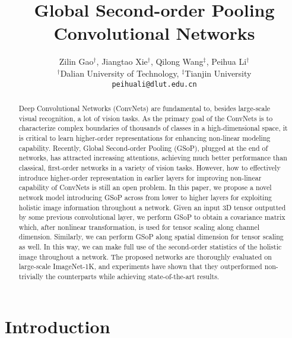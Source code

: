\documentclass[10pt,twocolumn,letterpaper]{article}
\begin{document}
\title{Global Second-order Pooling Convolutional Networks}

\author{Zilin Gao$^{\dagger}$, Jiangtao Xie$^{\dagger}$, Qilong Wang$^{\ddagger}$, Peihua Li$^{\dagger}$\\
$^{\dagger}$Dalian University of Technology, $^{\ddagger}$Tianjin University\\
{\tt\small peihuali@dlut.edu.cn}
}

\maketitle

\begin{abstract}
Deep Convolutional Networks (ConvNets) are fundamental to, besides  large-scale visual recognition, a lot of  vision tasks. As the primary goal of the ConvNets is  to characterize complex  boundaries of thousands of classes in a high-dimensional space, it is critical to learn higher-order representations for enhancing non-linear modeling capability.  Recently, Global Second-order Pooling (GSoP), plugged at the end of networks, has attracted increasing attentions, achieving much better performance than classical, first-order networks  in a variety of vision tasks. However, how to effectively introduce higher-order representation in earlier layers for improving non-linear capability of ConvNets  is still an open problem. In this paper, we propose a novel network model introducing GSoP across from lower to higher layers for exploiting holistic image information throughout a network. Given an input 3D tensor outputted by some previous convolutional  layer, we perform  GSoP to obtain a covariance matrix which, after nonlinear transformation, is  used for tensor scaling along channel dimension. Similarly, we can perform  GSoP along spatial dimension for tensor scaling as well. In this way, we can make full use of the second-order statistics  of the holistic image throughout a network.  The proposed networks are thoroughly  evaluated on large-scale ImageNet-1K, and experiments have shown that they outperformed non-trivially  the counterparts while achieving state-of-the-art results.
\end{abstract}

\section{Introduction}
\end{document}
